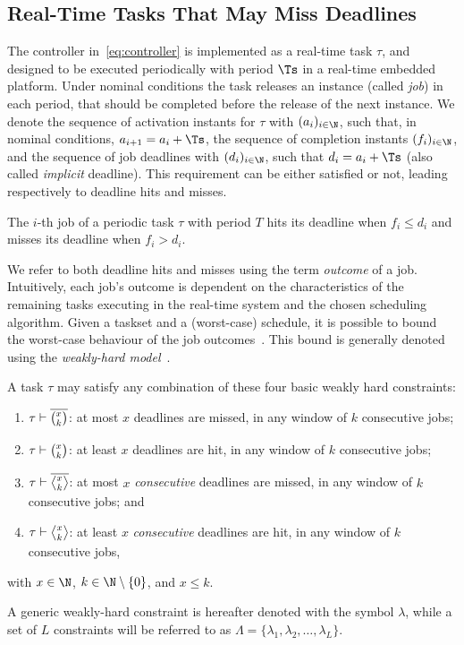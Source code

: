 \subsection{Real-Time Tasks That May Miss Deadlines}
\label{ssec:whalgebra}
%
The controller in~\eqref{eq:controller} is implemented as a real-time task $\tau$, and designed to be executed periodically with period $\Ts$ in a real-time embedded platform.
Under nominal conditions the task releases an instance (called \emph{job}) in each period, that should be completed before the release of the next instance.
We denote the sequence of activation instants for $\tau$ with $(a_i)_{i \in \N}$, such that, in nominal conditions, $a_{i+1} = a_i+\Ts$,  the sequence of completion instants $(f_i)_{i \in \N}$, and the sequence of job deadlines with $(d_i)_{i \in \N}$, such that $d_i = a_i + \Ts$ (also called \emph{implicit} deadline).
This requirement can be either satisfied or not, leading respectively to deadline hits and misses.
%
\begin{definition}%
\label{def:hit}%
    The $i$-th job of a periodic task $\tau$ with period $T$ hits its deadline when $f_i \leq d_i$ and misses its deadline when $f_i > d_i$.
\end{definition}
%
We refer to both deadline hits and misses using the term \emph{outcome} of a job.
Intuitively, each job's outcome is dependent on the characteristics of the remaining tasks executing in the real-time system and the chosen scheduling algorithm.
Given a taskset and a (worst-case) schedule, it is possible to bound the worst-case behaviour of the job outcomes~\cite{Bernat:2001, Ernst:2015}.
This bound is generally denoted using the \emph{weakly-hard model}~\cite{Bernat:2001}.

\begin{definition}%
\label{def:weakly-hard}%
    A task $\tau$ may satisfy any combination of these four basic weakly
    hard constraints:
    \begin{enumerate}[label=(\roman*)]
        \item \label{item:mk} $\tau \vdash \overline{\binom{x_{}}{k_{}}}$: at most $x$ deadlines are missed, in any window of $k$ consecutive jobs;
        \item \label{item:hk} $\tau \vdash \binom{x_{}}{k_{}}$: at least $x$ deadlines are hit, in any window of $k$ consecutive jobs;
        \item \label{item:cons} $\tau \vdash \rowmiss{}$: at most $x$ \emph{consecutive} deadlines are missed, in any window of $k$ consecutive jobs; and
        \item $\tau \vdash \rowhit{}$: at least $x$ \emph{consecutive} deadlines are hit, in any window of $k$ consecutive jobs,
    \end{enumerate}
    with $x\in \N$, $k \in \N\setminus \left\{ 0 \right\}$, and $x\leq k$.
\end{definition}
%
A generic weakly-hard constraint is hereafter denoted with the symbol $\lambda$, while a set of $L$ constraints will be referred to as $\Lambda = \{ \lambda_1, \lambda_2, \dots, \lambda_L \}$.


